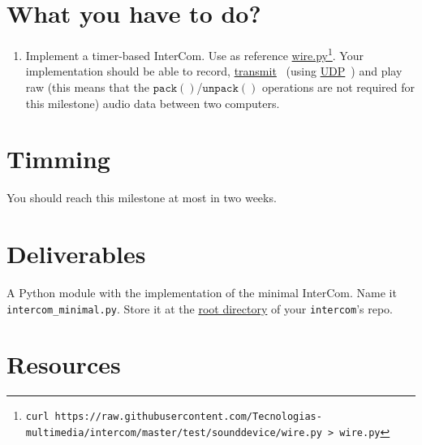 \section{What you have to do?}

\begin{enumerate}

\item Implement a timer-based InterCom. Use as reference
  \href{https://github.com/Tecnologias-multimedia/intercom/blob/master/test/sounddevice/wire.py}{wire.py}\footnote{
  \texttt{curl
    https://raw.githubusercontent.com/Tecnologias-multimedia/intercom/master/test/sounddevice/wire.py
    > wire.py} }. Your implementation should be able to record,
  \href{https://github.com/vicente-gonzalez-ruiz/YAPT/blob/master/03-IO/networking/sockets.ipynb}{transmit}~\cite{YAPT}
  (using
  \href{https://en.wikipedia.org/wiki/User_Datagram_Protocol}{UDP}~\cite{UDP})
  and play raw (this means that the
  $\mathtt{pack()}$/$\mathtt{unpack()}$ operations are not required for
    this milestone) audio data between two computers.
  
\end{enumerate}

\section{Timming}

You should reach this milestone at most in two weeks.

\section{Deliverables}

A Python module with the implementation of the minimal InterCom. Name
it \texttt{intercom\_minimal.py}. Store it at the
\href{https://github.com/Tecnologias-multimedia/intercom}{root
  directory} of your \texttt{intercom}'s repo.

\section{Resources}


